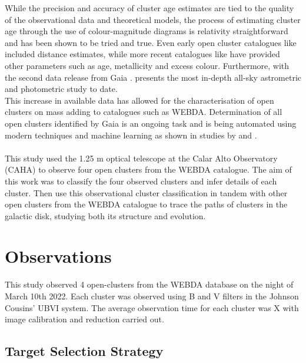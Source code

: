 While the precision and accuracy of cluster age estimates are tied to the quality of the observational data and theoretical models, the process of estimating cluster age through the use of colour-magnitude diagrams is relativity straightforward and has been shown to be tried and true. Even early open cluster catalogues like \cite{1988ESOC...28..379L} included distance estimates, while more recent catalogues like \cite{2008A&A...486..771K} have provided other parameters such as age, metallicity and excess colour. Furthermore, with the second data release from Gaia \citep[GDR2;][]{2018A&A...616A...1G}. 
presents the most in-depth all-sky astrometric and photometric study to date. \\

This increase in available data has allowed for the characterisation of open clusters on mass adding to catalogues such as WEBDA. Determination of all open clusters identified by Gaia is an ongoing task and is being automated using modern techniques and machine learning as shown in studies by \cite{2019A&A...623A.108B} and \cite{2020A&A...640A...1C}. \\

\\ 

This study used the 1.25 m optical telescope at the Calar Alto Observatory (CAHA) to observe four open clusters from the WEBDA catalogue. The aim of this work was to classify the four observed clusters and infer details of each cluster. Then use this observational cluster classification in tandem with other open clusters from the WEBDA catalogue to trace the paths of clusters in the galactic disk, studying both its structure and evolution.





\section{Observations} 

This study observed 4 open-clusters from the WEBDA database on the night of March 10th 2022. Each cluster was observed using B and V filters in the Johnson Cousins' UBVI system. The average observation time for each cluster was X with image calibration and reduction carried out. 

\subsection{Target Selection Strategy}


